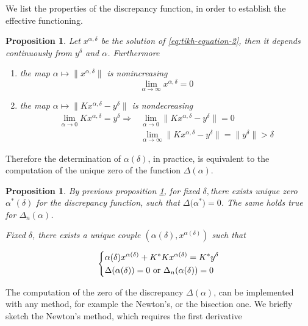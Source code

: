 \documentclass[10pt, a4paper, twoside, openright]{book}
\theoremstyle{definition}
\theoremstyle{plain}
\theoremstyle{plain}
\theoremstyle{plain}
\newtheorem{proposition}[subsection]{Proposition}
\theoremstyle{plain}
\theoremstyle{plain}
\theoremstyle{plain}
\theoremstyle{plain}
\theoremstyle{plain}
\begin{document}
We list the properties of the discrepancy function, in order to establish the effective functioning.
\begin{proposition}
\label{prop:properties-disc}
 Let $x^{\alpha,\delta}$ be the solution of \ref{eq:tikh-equation-2}, then 
 it depends continuously from $y^\delta$ and $\alpha$. Furthermore
 \begin{enumerate}
  \item the map $\alpha\mapsto \|x^{\alpha, \delta}\|$ is nonincreasing
  \begin{equation}
   \lim_{\alpha\to\infty} x^{\alpha, \delta} = 0
  \end{equation}
  \item the map $\alpha\mapsto \|Kx^{\alpha, \delta} - y^\delta\|$ is nondecreasing
  \begin{align}
   \lim_{\alpha\to0} Kx^{\alpha, \delta} = y^\delta \Rightarrow &\lim_{\alpha\to0}\|Kx^{\alpha, \delta} - y^\delta\| = 0\\
   &\lim_{\alpha\to\infty}\|Kx^{\alpha, \delta} - y^\delta\| = \|y^\delta\|>\delta
  \end{align}
 \end{enumerate}
\end{proposition}
Therefore the determination of $\alpha(\delta)$, in practice, is equivalent to the computation of the unique zero of the function $\Delta(\alpha)$.
\begin{proposition}
\label{prop:strategy-disc}
 By previous proposition \ref{prop:properties-disc}, for fixed $\delta, $there exists unique zero $\alpha^*(\delta)$ for the discrepancy function, such that $\Delta\bigl(\alpha^*\bigr)=0$. The same holds true for $\Delta_n(\alpha)$. 
 \begin{center}
  Fixed $\delta$, there exists a unique couple $(\alpha(\delta), x^{\alpha(\delta)})$ such that
 \end{center}
 \begin{equation}
  \left\{
  \begin{split}
   & \alpha(\delta) x^{\alpha(\delta)} + K^*Kx^{\alpha(\delta)} = K^*y^\delta \\
   & \Delta(\alpha(\delta))=0 \textup{ or } \Delta_n(\alpha(\delta))=0
  \end{split}
  \right.
 \end{equation}
\end{proposition}
The computation of the zero of the discrepancy $\Delta(\alpha)$, can be implemented with any method, for example the Newton's, or the bisection one.
We briefly sketch the Newton's method, which requires the first derivative
\end{document}
